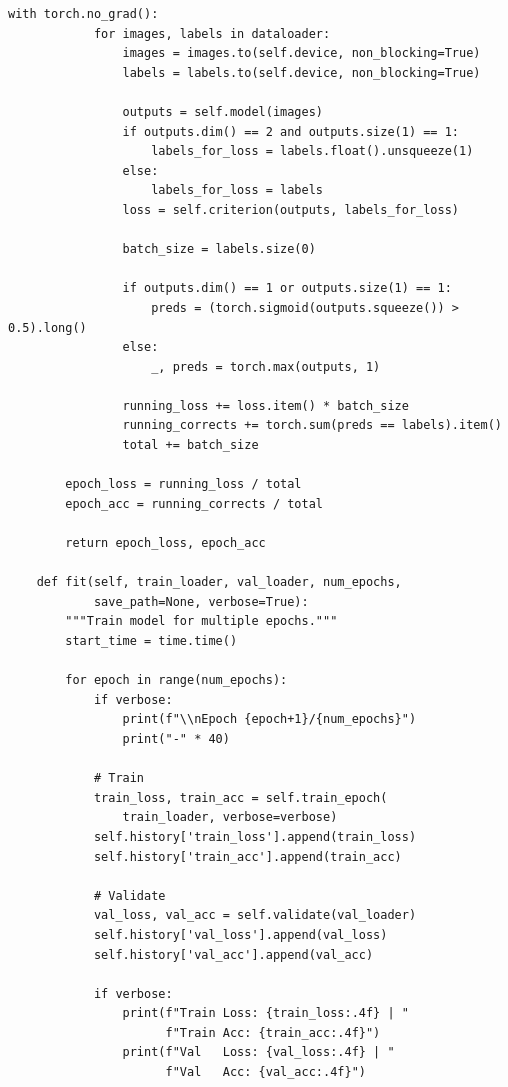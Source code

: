 \documentclass[man,12pt,letterpaper,donotrepeattitle,floatsintext]{apa7}
\begin{document}
\begin{lstlisting}[style=pythonstyle]
        with torch.no_grad():
            for images, labels in dataloader:
                images = images.to(self.device, non_blocking=True)
                labels = labels.to(self.device, non_blocking=True)
                
                outputs = self.model(images)
                if outputs.dim() == 2 and outputs.size(1) == 1:
                    labels_for_loss = labels.float().unsqueeze(1)
                else:
                    labels_for_loss = labels
                loss = self.criterion(outputs, labels_for_loss)
                
                batch_size = labels.size(0)
                
                if outputs.dim() == 1 or outputs.size(1) == 1:
                    preds = (torch.sigmoid(outputs.squeeze()) > 0.5).long()
                else:
                    _, preds = torch.max(outputs, 1)
                
                running_loss += loss.item() * batch_size
                running_corrects += torch.sum(preds == labels).item()
                total += batch_size
        
        epoch_loss = running_loss / total
        epoch_acc = running_corrects / total
        
        return epoch_loss, epoch_acc
    
    def fit(self, train_loader, val_loader, num_epochs, 
            save_path=None, verbose=True):
        """Train model for multiple epochs."""
        start_time = time.time()
        
        for epoch in range(num_epochs):
            if verbose:
                print(f"\\nEpoch {epoch+1}/{num_epochs}")
                print("-" * 40)
            
            # Train
            train_loss, train_acc = self.train_epoch(
                train_loader, verbose=verbose)
            self.history['train_loss'].append(train_loss)
            self.history['train_acc'].append(train_acc)
            
            # Validate
            val_loss, val_acc = self.validate(val_loader)
            self.history['val_loss'].append(val_loss)
            self.history['val_acc'].append(val_acc)
            
            if verbose:
                print(f"Train Loss: {train_loss:.4f} | "
                      f"Train Acc: {train_acc:.4f}")
                print(f"Val   Loss: {val_loss:.4f} | "
                      f"Val   Acc: {val_acc:.4f}")
            

\end{lstlisting}
\end{document}
